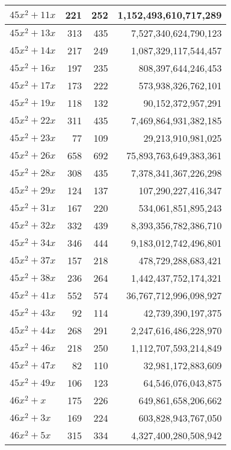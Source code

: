 \documentclass[a4paper]{amsproc}
\theoremstyle{plain}
\theoremstyle{named}
\begin{document}
\begin{longtable}{ | l | r | r | r | }
$45x^2 + 11x$ & 221 & 252 & 1{,}152{,}493{,}610{,}717{,}289 \\ \hline
$45x^2 + 13x$ & 313 & 435 & 7{,}527{,}340{,}624{,}790{,}123 \\ \hline
$45x^2 + 14x$ & 217 & 249 & 1{,}087{,}329{,}117{,}544{,}457 \\ \hline
$45x^2 + 16x$ & 197 & 235 & 808{,}397{,}644{,}246{,}453 \\ \hline
$45x^2 + 17x$ & 173 & 222 & 573{,}938{,}326{,}762{,}101 \\ \hline
$45x^2 + 19x$ & 118 & 132 & 90{,}152{,}372{,}957{,}291 \\ \hline
$45x^2 + 22x$ & 311 & 435 & 7{,}469{,}864{,}931{,}382{,}185 \\ \hline
$45x^2 + 23x$ & 77 & 109 & 29{,}213{,}910{,}981{,}025 \\ \hline
$45x^2 + 26x$ & 658 & 692 & 75{,}893{,}763{,}649{,}383{,}361 \\ \hline
$45x^2 + 28x$ & 308 & 435 & 7{,}378{,}341{,}367{,}226{,}298 \\ \hline
$45x^2 + 29x$ & 124 & 137 & 107{,}290{,}227{,}416{,}347 \\ \hline
$45x^2 + 31x$ & 167 & 220 & 534{,}061{,}851{,}895{,}243 \\ \hline
$45x^2 + 32x$ & 332 & 439 & 8{,}393{,}356{,}782{,}386{,}710 \\ \hline
$45x^2 + 34x$ & 346 & 444 & 9{,}183{,}012{,}742{,}496{,}801 \\ \hline
$45x^2 + 37x$ & 157 & 218 & 478{,}729{,}288{,}683{,}421 \\ \hline
$45x^2 + 38x$ & 236 & 264 & 1{,}442{,}437{,}752{,}174{,}321 \\ \hline
$45x^2 + 41x$ & 552 & 574 & 36{,}767{,}712{,}996{,}098{,}927 \\ \hline
$45x^2 + 43x$ & 92 & 114 & 42{,}739{,}390{,}197{,}375 \\ \hline
$45x^2 + 44x$ & 268 & 291 & 2{,}247{,}616{,}486{,}228{,}970 \\ \hline
$45x^2 + 46x$ & 218 & 250 & 1{,}112{,}707{,}593{,}214{,}849 \\ \hline
$45x^2 + 47x$ & 82 & 110 & 32{,}981{,}172{,}883{,}609 \\ \hline
$45x^2 + 49x$ & 106 & 123 & 64{,}546{,}076{,}043{,}875 \\ \hline
$46x^2 + x$ & 175 & 226 & 649{,}861{,}658{,}206{,}662 \\ \hline
$46x^2 + 3x$ & 169 & 224 & 603{,}828{,}943{,}767{,}050 \\ \hline
$46x^2 + 5x$ & 315 & 334 & 4{,}327{,}400{,}280{,}508{,}942 \\ \hline

\end{longtable}
\end{document}
